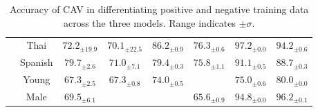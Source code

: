 \begin{table}[H]
\begin{tabular}{|c|c|cc|cc|cc|}
                                                                                 & Thai                              & \multicolumn{1}{c|}{$72.2_{\pm 19.9}$}                    & $70.1_{\pm 22.5}$                     & \multicolumn{1}{c|}{$86.2_{\pm 0.9}$}                     & $76.3_{\pm 0.6}$                     & \multicolumn{1}{c|}{$97.2_{\pm 0.0}$}                     & $94.2_{\pm 0.6}$ \\
                                                                                 & Spanish                           & \multicolumn{1}{c|}{$79.7_{\pm 2.6}$}                     & $71.0_{\pm 7.1}$                      & \multicolumn{1}{c|}{$79.4_{\pm 0.3}$}                     & $75.8_{\pm 1.1}$                     & \multicolumn{1}{c|}{$91.1_{\pm 0.5}$}                     & $88.7_{\pm 0.3}$ \\ \cline{2-8}
                                                                                 & Young                             & \multicolumn{1}{c|}{$67.3_{\pm 2.5}$}                     & $67.3_{\pm 0.8}$                      & \multicolumn{1}{c|}{$74.0_{\pm 0.5}$}                     & \cellcolor{red!15}{$56.4_{\pm 0.3}$} & \multicolumn{1}{c|}{$75.0_{\pm 0.6}$}                     & $80.0_{\pm 0.0}$ \\ \cline{2-8}
                                                                                 & Male                              & \multicolumn{1}{c|}{$69.5_{\pm 6.1}$}                     & \cellcolor{red!15}{$51.7_{\pm 9.1}$}  & \multicolumn{1}{c|}{\cellcolor{red!15}{$59.2_{\pm 0.5}$}} & $65.6_{\pm 0.9}$                     & \multicolumn{1}{c|}{$94.8_{\pm 0.0}$}                     & $96.2_{\pm 0.1}$ \\ \hline
    \end{tabular}
    \caption{Accuracy of CAV in differentiating positive and negative training data across the three models. Range indicates $\pm \sigma$.}
    \label{tab:CAV_accuracy_combined}
\end{table}

